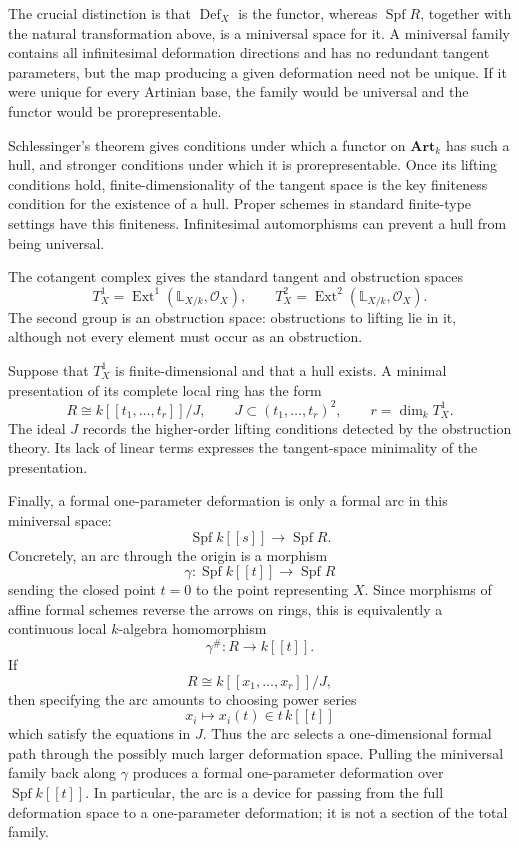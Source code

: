 \noindent
The crucial distinction is that
$\operatorname{Def}_X$ is the functor,
whereas $\operatorname{Spf}R$, together
with the natural transformation above, is
a miniversal space for it.
A miniversal family contains all
infinitesimal deformation directions and has
no redundant tangent parameters, but the map
producing a given deformation need not be
unique. If it were unique for every Artinian
base, the family would be universal and the
functor would be prorepresentable.

Schlessinger's theorem gives conditions under
which a functor on $\mathbf{Art}_k$ has such
a hull, and stronger conditions under which
it is prorepresentable. Once its lifting
conditions hold, finite-dimensionality of
the tangent space is the key finiteness
condition for the existence of a hull.
Proper schemes in standard finite-type
settings have this finiteness. Infinitesimal
automorphisms can prevent a hull from being
universal.

The cotangent complex gives the standard
tangent and obstruction spaces
$$
T^1_X=\operatorname{Ext}^1
(\mathbb{L}_{X/k},\mathcal{O}_X),
\qquad
T^2_X=\operatorname{Ext}^2
(\mathbb{L}_{X/k},\mathcal{O}_X).
$$
The second group is an obstruction space:
obstructions to lifting lie in it, although
not every element must occur as an
obstruction.

Suppose that $T^1_X$ is finite-dimensional
and that a hull exists. A minimal
presentation of its complete local ring has
the form
$$
R\cong k[[t_1,\ldots,t_r]]/J,
\qquad
J\subset (t_1,\ldots,t_r)^2,
\qquad
r=\dim_kT^1_X.
$$
The ideal $J$ records the higher-order
lifting conditions detected by the
obstruction theory. Its lack of linear terms
expresses the tangent-space minimality of the
presentation.

Finally, a formal one-parameter deformation
is only a formal arc in this miniversal
space:
$$
\operatorname{Spf}k[[s]]
\longrightarrow
\operatorname{Spf}R.
$$
Concretely, an arc through the origin is a morphism
$$
\gamma:\operatorname{Spf}k[[t]]
\longrightarrow
\operatorname{Spf}R
$$
sending the closed point $t=0$ to the point representing
$X$. Since morphisms of affine formal schemes reverse the
arrows on rings, this is equivalently a continuous local
$k$-algebra homomorphism
$$
\gamma^\#:R\longrightarrow k[[t]].
$$
If
$$
R\cong k[[x_1,\ldots,x_r]]/J,
$$
then specifying the arc amounts to choosing power series
$$
x_i\longmapsto x_i(t)\in t\,k[[t]]
$$
which satisfy the equations in $J$. Thus the arc selects a
one-dimensional formal path through the possibly much
larger deformation space. Pulling the miniversal family
back along $\gamma$ produces a formal one-parameter
deformation over $\operatorname{Spf}k[[t]]$. In particular,
the arc is a device for passing from the full deformation
space to a one-parameter deformation; it is not a section
of the total family.


